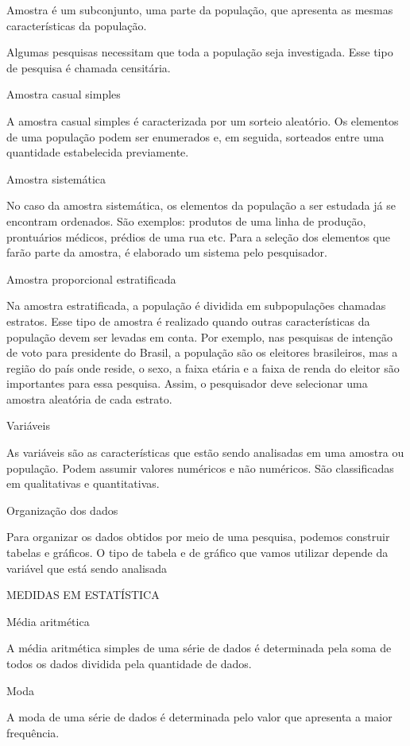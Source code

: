 {Amostra é um subconjunto, uma parte da população, que apresenta as
mesmas características da população.

Algumas pesquisas necessitam que toda a população seja investigada. Esse
tipo de pesquisa é chamada censitária.

Amostra casual simples

A amostra casual simples é caracterizada por um sorteio aleatório. Os
elementos de uma população podem ser enumerados e, em seguida, sorteados
entre uma quantidade estabelecida previamente.

Amostra sistemática

No caso da amostra sistemática, os elementos da população a ser estudada
já se encontram ordenados. São exemplos: produtos de uma linha de
produção, prontuários médicos, prédios de uma rua etc. Para a seleção
dos elementos que farão parte da amostra, é elaborado um sistema pelo
pesquisador.

Amostra proporcional estratificada

Na amostra estratificada, a população é dividida em subpopulações
chamadas estratos. Esse tipo de amostra é realizado quando outras
características da população devem ser levadas em conta. Por exemplo,
nas pesquisas de intenção de voto para presidente do Brasil, a população
são os eleitores brasileiros, mas a região do país onde reside, o sexo,
a faixa etária e a faixa de renda do eleitor são importantes para essa
pesquisa. Assim, o pesquisador deve selecionar uma amostra aleatória de
cada estrato.

Variáveis

As variáveis são as características que estão sendo analisadas em uma
amostra ou população. Podem assumir valores numéricos e não numéricos.
São classificadas em qualitativas e quantitativas.

Organização dos dados

Para organizar os dados obtidos por meio de uma pesquisa, podemos
construir tabelas e gráficos. O tipo de tabela e de gráfico que vamos
utilizar depende da variável que está sendo analisada

MEDIDAS EM ESTATÍSTICA

Média aritmética

A média aritmética simples de uma série de dados é determinada pela soma
de todos os dados dividida pela quantidade de dados.

Moda

A moda de uma série de dados é determinada pelo valor que apresenta a
maior frequência.

}
